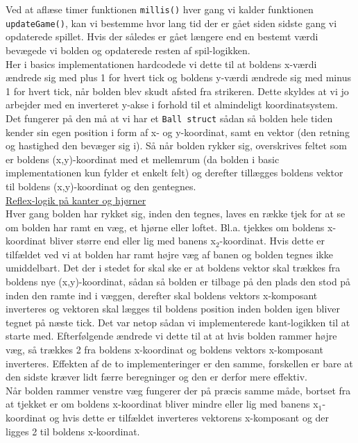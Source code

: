 Ved at aflæse timer funktionen \texttt{millis()} hver gang vi kalder funktionen \texttt{updateGame()}, kan vi bestemme hvor lang tid der er gået siden sidste gang vi opdaterede spillet. Hvis der således er gået længere end en bestemt værdi bevægede vi bolden og opdaterede resten af spil-logikken.\\

Her i basics implementationen hardcodede vi dette til at boldens x-værdi ændrede sig med plus 1 for hvert tick og boldens y-værdi ændrede sig med minus 1 for hvert tick, når bolden blev skudt afsted fra strikeren. Dette skyldes at vi jo arbejder med en inverteret y-akse i forhold til et almindeligt koordinatsystem. Det fungerer på den må at vi har et \texttt{Ball struct} sådan så bolden hele tiden kender sin egen position i form af x- og y-koordinat, samt en vektor (den retning og hastighed den bevæger sig i). Så når bolden rykker sig, overskrives feltet som er boldens (x,y)-koordinat med et mellemrum (da bolden i basic implementationen kun fylder et enkelt felt) og derefter tillægges boldens vektor til boldens (x,y)-koordinat og den gentegnes.\\

\underline{Reflex-logik på kanter og hjørner}\\

Hver gang bolden har rykket sig, inden den tegnes, laves en række tjek for at se om bolden har ramt en væg, et hjørne eller loftet. Bl.a. tjekkes om boldens x-koordinat bliver større end eller lig med banens x$_{2}$-koordinat. Hvis dette er tilfældet ved vi at bolden har ramt højre væg af banen og bolden tegnes ikke umiddelbart. Det der i stedet for skal ske er at boldens vektor skal trækkes fra boldens nye (x,y)-koordinat, sådan så bolden er tilbage på den plads den stod på inden den ramte ind i væggen, derefter skal boldens vektors x-komposant inverteres og vektoren skal lægges til boldens position inden bolden igen bliver tegnet på næste tick. Det var netop sådan vi implementerede kant-logikken til at starte med. Efterfølgende ændrede vi dette til at at hvis bolden rammer højre væg, så trækkes 2 fra boldens x-koordinat og boldens vektors x-komposant inverteres. Effekten af de to implementeringer er den samme, forskellen er bare at den sidste kræver lidt færre beregninger og den er derfor mere effektiv.\\
Når bolden rammer venstre væg fungerer der på præcis samme måde, bortset fra at tjekket er om boldens x-koordinat bliver mindre eller lig med banens x$_{1}$-koordinat og hvis dette er tilfældet inverteres vektorens x-komposant og der ligges 2 til boldens x-koordinat.\\


